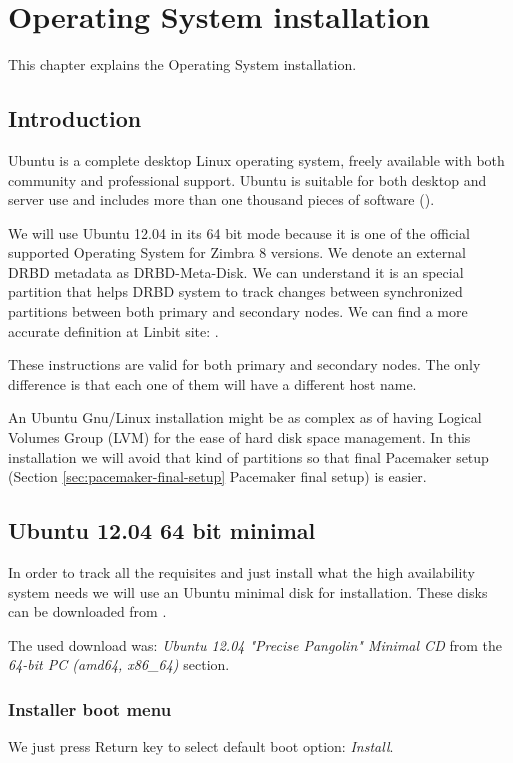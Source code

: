 

\chapter{Operating System installation}
\label{chap:operating-system-installation}
This chapter explains the Operating System installation.

\section {Introduction}
Ubuntu is a complete desktop Linux operating system, freely available with both community and professional support. Ubuntu is suitable for both desktop and server use and includes more than one thousand pieces of software (\cite{UbuntuWhatIs}).

We will use Ubuntu 12.04 in its 64 bit mode because it is one of the official supported Operating System for Zimbra 8 versions. We denote an external DRBD metadata as DRBD-Meta-Disk. We can understand it is an special partition that helps DRBD system to track changes between synchronized partitions between both primary and secondary nodes. We can find a more accurate definition at Linbit site: \cite{LinbitDRBDInternals}.

These instructions are valid for both primary and secondary nodes. The only difference is that each one of them will have a different host name.

An Ubuntu Gnu/Linux installation might be as complex as of having Logical Volumes Group (LVM) for the ease of hard disk space management. In this installation we will avoid that kind of partitions so that final Pacemaker setup (Section {\ref{sec:pacemaker-final-setup} Pacemaker final setup}) is easier.

\section {Ubuntu 12.04 64 bit minimal}
In order to track all the requisites and just install what the high availability system needs we will use an Ubuntu minimal disk for installation. These disks can be downloaded from \cite{UbuntuMinimalDisk}.

The used download was: \textit{Ubuntu 12.04 "Precise Pangolin" Minimal CD} from the \textit{64-bit PC (amd64, x86\_64)} section. 

\subsection {Installer boot menu}
We just press Return key to select default boot option: \textit{Install}.
